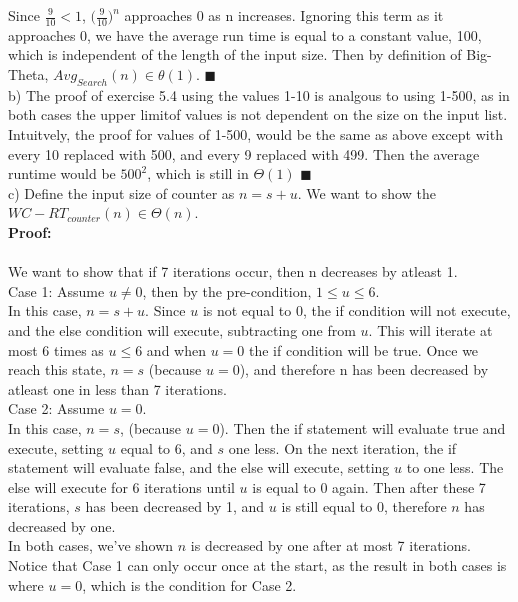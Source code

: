 \documentclass{article}
\begin{document}
\begin{enumerate}
	Since $\frac{9}{10} < 1$, $ \Big( \frac{9}{10}\Big)^n$ approaches 0 as n increases. Ignoring this term as it approaches 0, we have the average run time is equal to a constant value, 100, which is independent of the length of the input size. Then by definition of Big-Theta, $Avg_{Search}(n) \in \theta(1)$.  \null\hfill $\blacksquare$\\ 
	
	b) The proof of exercise 5.4 using the values 1-10 is analgous to using 1-500, as in both cases the upper limitof values is not dependent on the size on the input list. Intuitvely, the proof for values of 1-500, would be the same as above except with every 10 replaced with 500, and every 9 replaced with 499. Then the average runtime would be $500^2$, which is still in $\Theta(1)$ \null\hfill $\blacksquare$\\ 
	
	c)  Define the input size of counter as $n = s + u$. We want to show the $WC-RT_{counter}(n) \in \Theta(n)$. \\
	
	\textbf{Proof:}\\\\
	We want to show that if 7 iterations occur, then n decreases by atleast 1.\\
	Case 1: Assume $u \neq 0$, then by the pre-condition, $1 \leq u \leq 6$. \\
	In this case, $n = s + u$. Since $u$ is not equal to 0, the if condition will not execute, and the else condition will execute, subtracting one from $u$. This will iterate at most 6 times as $u \leq 6$ and when $u = 0$ the if condition will be true. Once we reach this state, $n = s$ (because $u = 0$), and therefore n has been decreased by atleast one in less than 7 iterations. \\
	
	Case 2: Assume $u = 0$. \\
	In this case, $n = s$, (because $u = 0$). Then the if statement will evaluate true and execute, setting $u$ equal to 6, and $s$ one less. On the next iteration, the if statement will evaluate false, and the else will execute, setting $u$ to one less. The else will execute for 6 iterations until $u$ is equal to 0 again. Then after these 7 iterations, $s$ has been decreased by 1, and $u$ is still equal to 0, therefore $n$ has decreased by one.\\
	
	In both cases, we've shown $n$ is decreased by one after at most 7 iterations. Notice that Case 1 can only occur once at the start, as the result in both cases is where $u = 0$, which is the condition for Case 2. \\
	

\end{enumerate}
\end{document}
